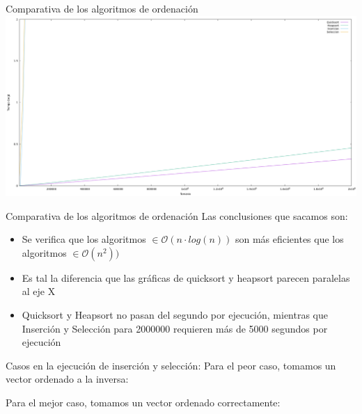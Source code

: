\documentclass[10pt, xcolor=table]{beamer}
\begin{document}
\begin{frame}[fragile]{Comparativa de los algoritmos de ordenación}
	\centering
	\includegraphics[scale=0.15]{../../Images/Grafica_comparativa_algoritmos_ordenacion_Joshoccas_(HyQ).png}
\end{frame}

\begin{frame}[fragile]{Comparativa de los algoritmos de ordenación}
Las conclusiones que sacamos son:
\begin{itemize}
	\item Se verifica que los algoritmos \(\in \mathcal{O}(n \cdot log(n))\) son más eficientes que los algoritmos \(\in \mathcal{O}(n^2))\)
	\item Es tal la diferencia que las gráficas de quicksort y heapsort parecen paralelas al eje X
	\item Quicksort y Heapsort no pasan del segundo por ejecución, mientras que Inserción y Selección para 2000000 requieren más de 5000 segundos por ejecución
\end{itemize}
\end{frame}

\begin{frame}{Casos en la ejecución de inserción y selección: 
}
	Para el peor caso, tomamos un vector ordenado a la inversa:
	
	Para el mejor caso, tomamos un vector ordenado correctamente:
	
	
\end{frame}
\end{document}
